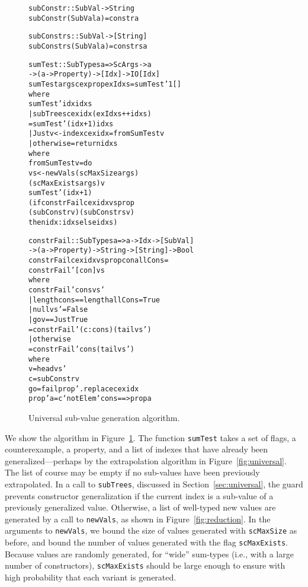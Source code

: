 \documentclass{sigplanconf}
\newenvironment{code}{\begin{alltt}\footnotesize}{\end{alltt}}
\newcommand{\ttp}[1]{\texttt{#1}}
\begin{document}
\begin{figure}
  \begin{code}
subConstr :: SubVal -> String
subConstr (SubVal a) = constr a

subConstrs :: SubVal -> [String]
subConstrs (SubVal a) = constrs a

sumTest :: SubTypes a => ScArgs -> a
  -> (a -> Property) -> [Idx] -> IO [Idx]
sumTest args cex prop exIdxs = sumTest' 1 []
  where
  sumTest' idx idxs
    | subTrees cex idx (exIdxs ++ idxs)
    = sumTest' (idx+1) idxs
    | Just v <- index cex idx = fromSumTest v
    | otherwise = return idxs
    where
    fromSumTest v = do
      vs <- newVals (scMaxSize args)
              (scMaxExists args) v
      sumTest' (idx+1)
        (if constrFail cex idx vs prop
           (subConstr v) (subConstrs v)
           then idx:idxs else idxs)

constrFail :: SubTypes a => a -> Idx -> [SubVal]
  -> (a -> Property) -> String -> [String] -> Bool
constrFail cex idx vs prop con allCons =
  constrFail' [con] vs
  where
  constrFail' cons vs'
    | length cons == length allCons = True
    | null vs'                      = False
    | go v == Just True
    = constrFail' (c:cons) (tail vs')
    | otherwise
    = constrFail' cons (tail vs')
    where
    v  = head vs'
    c  = subConstr v
    go = fail prop' . replace cex idx
    prop' a = c `notElem` cons ==> prop a
  \end{code}
  \caption{Universal sub-value generation algorithm.}
  \label{fig:constrs}
\end{figure}

We show the algorithm in Figure~\ref{fig:constrs}.  The function \ttp{sumTest}
takes a set of flags, a counterexample, a property, and a list of indexes that
have already been generalized---perhaps by the extrapolation algorithm in
Figure~\ref{fig:universal}.  The list of course may be empty if no sub-values
have been previously extrapolated.  In a call to \ttp{subTrees}, discussed in
Section~\ref{sec:universal}, the guard prevents constructor generalization if
the current index is a sub-value of a previously generalized value.  Otherwise,
a list of well-typed new values are generated by a call to \ttp{newVals}, as
shown in Figure~\ref{fig:reduction}.  In the arguments to \ttp{newVals}, we
bound the size of values generated with \ttp{scMaxSize} as before, and bound the
number of values generated with the flag \ttp{scMaxExists}.  Because values are
randomly generated, for ``wide'' sum-types (i.e., with a large number of
constructors), \ttp{scMaxExists} should be large enough to ensure with high
probability that each variant is generated.
\end{document}
